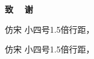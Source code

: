 \begin{center}
    { \hwfs \textbf{致 ~ 谢} }
\end{center}

\begin{spacing}{1.5}
    {  \fangsong
    仿宋 小四号1.5倍行距，

   仿宋 小四号1.5倍行距，
    }
\end{spacing}
\newpage